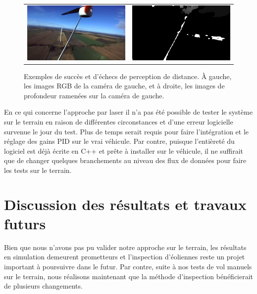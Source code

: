 \begin{figure}
\begin{tabular}{cc}
    \includegraphics[width=0.5\linewidth]{images/field_stereo_success_rgb2.png} &
    \includegraphics[width=0.5\linewidth]{images/field_stereo_success_pcl2.png} \\
  \end{tabular}
  \caption{Exemples de succès et d'échecs de perception de distance. À gauche, les images RGB de la caméra de gauche, et à droite, les images de profondeur ramenées sur la caméra de gauche.}
  \label{fig:field_stereo_fail}
\end{figure}

En ce qui concerne l'approche par laser il n'a pas été possible de tester le système sur le terrain en raison de différentes circonstances et d'une erreur logicielle survenue le jour du test. Plus de temps serait requis pour faire l'intégration et le réglage des gains PID sur le vrai véhicule. Par contre, puisque l'entièreté du logiciel est déjà écrite en C++ et prête à installer sur le véhicule, il ne suffirait que de changer quelques branchements au niveau des flux de données pour faire les tests sur le terrain.

\clearpage
\section{Discussion des résultats et travaux futurs}
\label{uav:results_conclusion_future_work}

Bien que nous n'avons pas pu valider notre approche sur le terrain, les résultats en simulation demeurent prometteurs et l'inspection d'éoliennes reste un projet important à poursuivre dans le futur. Par contre, suite à nos tests de vol manuels sur le terrain, nous réalisons maintenant que la méthode d'inspection bénéficierait de plusieurs changements.

